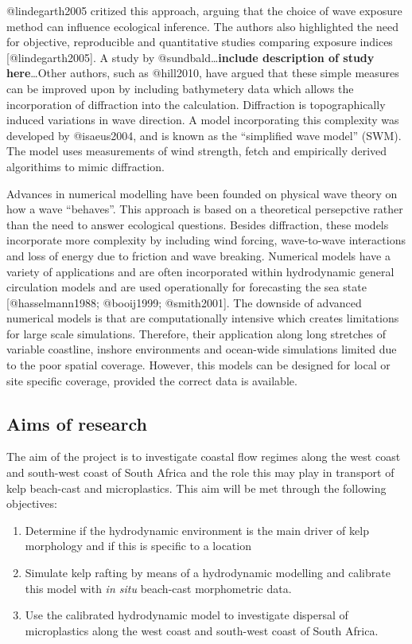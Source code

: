 \documentclass[]{article}
\providecommand{\tightlist}{%
  \setlength{\itemsep}{0pt}\setlength{\parskip}{0pt}}
\begin{document}
@lindegarth2005 critized this approach, arguing that the choice of wave
exposure method can influence ecological inference. The authors also
highlighted the need for objective, reproducible and quantitative
studies comparing exposure indices {[}@lindegarth2005{]}. A study by
@sundbald\ldots{}\textbf{include description of study here}\ldots{}Other
authors, such as @hill2010, have argued that these simple measures can
be improved upon by including bathymetery data which allows the
incorporation of diffraction into the calculation. Diffraction is
topographically induced variations in wave direction. A model
incorporating this complexity was developed by @isaeus2004, and is known
as the ``simplified wave model'' (SWM). The model uses measurements of
wind strength, fetch and empirically derived algorithims to mimic
diffraction.

Advances in numerical modelling have been founded on physical wave
theory on how a wave ``behaves''. This approach is based on a
theoretical persepctive rather than the need to answer ecological
questions. Besides diffraction, these models incorporate more complexity
by including wind forcing, wave-to-wave interactions and loss of energy
due to friction and wave breaking. Numerical models have a variety of
applications and are often incorporated within hydrodynamic general
circulation models and are used operationally for forecasting the sea
state {[}@hasselmann1988; @booij1999; @smith2001{]}. The downside of
advanced numerical models is that are computationally intensive which
creates limitations for large scale simulations. Therefore, their
application along long stretches of variable coastline, inshore
environments and ocean-wide simulations limited due to the poor spatial
coverage. However, this models can be designed for local or site
specific coverage, provided the correct data is available.

\subsection{Aims of research}\label{aims-of-research}

The aim of the project is to investigate coastal flow regimes along the
west coast and south-west coast of South Africa and the role this may
play in transport of kelp beach-cast and microplastics. This aim will be
met through the following objectives:

\begin{enumerate}
\def\labelenumi{\Alph{enumi})}
\tightlist
\item
  Determine if the hydrodynamic environment is the main driver of kelp
  morphology and if this is specific to a location
\item
  Simulate kelp rafting by means of a hydrodynamic modelling and
  calibrate this model with \emph{in situ} beach-cast morphometric data.
\item
  Use the calibrated hydrodynamic model to investigate dispersal of
  microplastics along the west coast and south-west coast of South
  Africa.
\end{enumerate}
\end{document}
